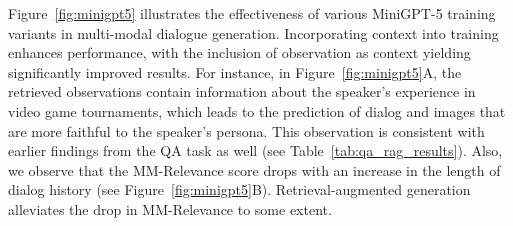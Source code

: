 Figure~\ref{fig:minigpt5} illustrates the effectiveness of various MiniGPT-5 training variants in multi-modal dialogue generation. Incorporating context into training enhances performance, with the inclusion of observation as context yielding significantly improved results. For instance, in Figure~\ref{fig:minigpt5}A, the retrieved observations contain information about the speaker's experience in video game tournaments, which leads to the prediction of dialog and images that are more faithful to the speaker's persona.
This observation is consistent with earlier findings from the QA task as well (see Table~\ref{tab:qa_rag_results}). Also, we observe that the MM-Relevance score drops with an increase in the length of dialog history (see Figure~\ref{fig:minigpt5}B). Retrieval-augmented generation alleviates the drop in MM-Relevance to some extent. 
